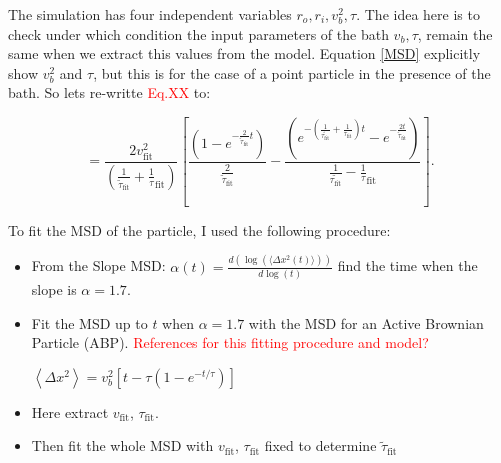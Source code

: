 \documentclass[%
10pt,
superscriptaddress,
twocolumn,
 amsmath,amssymb,
 aps,prx,
]{revtex4-2}
\begin{document}
The simulation has four independent variables $r_o,r_i,v_b^2,\tau$. 
The idea here is to check under which condition the input parameters of the bath $v_b, \tau$, remain the same when we extract this values from the model. Equation \ref*{MSD} explicitly show $v_b^2$ and $\tau$, but this is for the case of a point particle in the presence of the bath. So lets re-writte \textcolor{red}{Eq.XX} to:

\begin{equation}
	\label{MSD_fit}
	=\frac{2v_{\text{fit}}^2}{(\frac{1}{\tilde{\tau}_{\text{fit}}}+\frac{1}{\tau}_{\text{fit}})}\left[\frac{(1-e^{-\frac{2}{\tilde{\tau}_{\text{fit}}} t})}{\frac{2}{\tilde{\tau}_{\text{fit}}}}-\frac{(e^{-(\frac{1}{\tilde{\tau_{\text{fit}}}}+\frac{1}{\tau_{\text{fit}}})t}-e^{-\frac{2t}{\tilde{\tau}_{\text{fit}}} })}{\frac{1}{\tilde{\tau_{\text{fit}}}}-\frac{1}{\tau}_{\text{fit}}}\right].
\end{equation}

To fit the MSD of the particle, I used the following procedure:
\begin{itemize}
\item From the Slope MSD: $\alpha(t) = \frac{d(\log(\langle \Delta x^2 (t)\rangle))}{d\log(t)}$ find the time when the slope is $\alpha = 1.7$. 
\item Fit the MSD up to $t$ when $\alpha = 1.7$ with the MSD for an Active Brownian Particle (ABP). \textcolor{red}{References for this fitting procedure and model?}

$\left<\Delta x^2\right>= v_b^2\left[t-\tau(1-e^{-t/\tau})\right]$
\item Here extract $v_{\text{fit}}$, $\tau_{\text{fit}}$.
\item Then fit the whole MSD with $v_{\text{fit}}$, $\tau_{\text{fit}}$ fixed to determine $\tilde{\tau}_\text{fit}$
\end{itemize}
\end{document}

